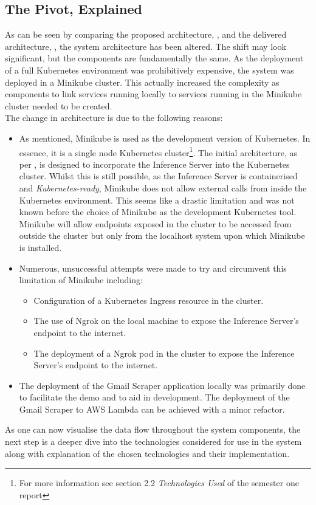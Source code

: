 \subsection{The Pivot, Explained}
\label{sec:pivot}
As can be seen by comparing the proposed architecture, , and the delivered architecture, ,
the system architecture has been altered. The shift may look significant, but the components are fundamentally the same. As the deployment
of a full Kubernetes environment was prohibitively expensive, the system was deployed in a Minikube cluster. This actually
increased the complexity as components to link services running locally to services running in the Minikube cluster needed to be created. \\
The change in architecture is due to the following reasons:
\begin{itemize}
	\item As mentioned, Minikube is used as the development version of Kubernetes. In essence, it is a single node Kubernetes
	      cluster\footnote{For more information see section 2.2 \emph{Technologies Used} of the semester one report}.
	      The initial architecture, as per , is designed to incorporate the Inference Server into the
	      Kubernetes cluster. Whilst this is still possible, as the Inference Server is containerised and \emph{Kubernetes-ready},
	      Minikube does not allow external calls from inside the Kubernetes environment. This seems like a drastic limitation and was
	      not known before the choice of Minikube as the development Kubernetes tool. Minikube will allow endpoints exposed in the
	      cluster to be accessed from outside the cluster but only from the localhost system upon which Minikube is installed.
	\item Numerous, unsuccessful attempts were made to try and circumvent this limitation of Minikube including:
	      \begin{itemize}
		      \item Configuration of a Kubernetes Ingress resource in the cluster.
		      \item The use of Ngrok on the local machine to expose the Inference Server's endpoint to the internet.
		      \item The deployment of a Ngrok pod in the cluster to expose the Inference Server's endpoint to the internet.
	      \end{itemize}
	\item The deployment of the Gmail Scraper application locally was primarily done to facilitate the demo and to aid in development. The
	      deployment of the Gmail Scraper to AWS Lambda can be achieved with a minor refactor.
\end{itemize}
As one can now visualise the data flow throughout the system components, the next step is a deeper dive into the technologies considered
for use in the system along with explanation of the chosen technologies and their implementation.
\newpage
